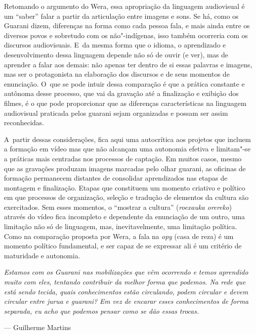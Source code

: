 Retomando o argumento do Wera, essa apropriação da linguagem audiovisual
é um ``saber'' falar a partir da articulação
entre imagens e sons. Se há, como os Guarani dizem, diferenças na forma
como cada pessoa fala, e mais ainda entre os diversos povos e sobretudo
com os não"-indígenas, isso também ocorreria com os discursos
audiovisuais. E~da mesma forma que o idioma, o aprendizado e
desenvolvimento dessa linguagem depende não só de ouvir (e ver), mas de
aprender a falar aos demais: não apenas ter dentro de si essas palavras
e imagens, mas ser o protagonista na elaboração dos discursos e de seus
momentos de enunciação. O~que se pode intuir dessa comparação é que a
prática constante e autônoma desse processo, que vai da gravação até a
finalização e exibição dos filmes, é o que pode proporcionar que as
diferenças características na linguagem audiovisual praticada pelos
guarani sejam organizadas e possam ser assim reconhecidas. 

A~partir dessas considerações, fica aqui uma autocrítica aos projetos
que incluem a formação em vídeo mas que não alcançam uma autonomia
efetiva e limitam"-se a práticas mais centradas nos processos de
captação. Em muitos casos, mesmo que as gravações produzam imagens
marcadas pelo olhar guarani, as oficinas de formação permanecem
distantes de consolidar aprendizados nas etapas de montagem e
finalização. Etapas que constituem um momento criativo e político em
que processos de organização, seleção e tradução de elementos da
cultura são exercitados. Sem esses momentos, o ``mostrar a cultura''
(\emph{roexauka orereko}) através do vídeo fica incompleto e dependente da
enunciação de um outro, uma limitação não só de linguagem, mas,
inevitavelmente, uma limitação política. Como na comparação proposta
por Wera, a fala na \emph{opy} (casa de reza) é um momento político
fundamental, e ser capaz de se expressar ali é um critério de
maturidade e autonomia.

\clearpage

\vspace*{\fill}

\begin{flushleft}
\begin{minipage}[c]{0.85\textwidth}
\raggedright
\footnotesize
\emph{Estamos com os Guarani nas mobilizações que vêm ocorrendo e temos
aprendido muito com eles, tentando contribuir da melhor forma que
podemos. Na rede que está sendo tecida, quais conhecimentos estão
circulando, podem circular e devem circular entre \emph{jurua} e guarani? Em
vez de encarar esses conhecimentos de forma separada, eu acho que
podemos pensar como se dão essas trocas.}

\smallskip
\hspace*{\fill}--- Guilherme Martins
\end{minipage}
\end{flushleft}

